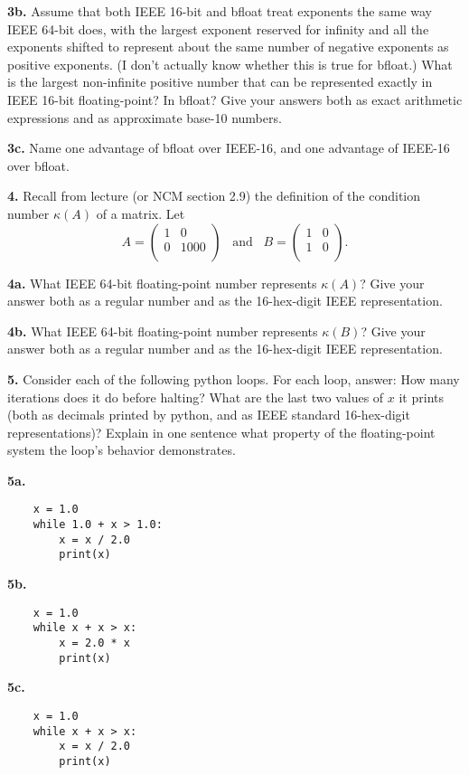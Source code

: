 \documentclass[11pt]{article}
\begin{document}
\par\medskip
{\bf 3b.}
Assume that both IEEE 16-bit and bfloat treat exponents the same way IEEE 64-bit
does, with the largest exponent reserved for infinity and all the exponents
shifted to represent about the same number of negative exponents as positive
exponents. (I don't actually know whether this is true for bfloat.)
What is the largest non-infinite positive number that can be represented exactly
in IEEE 16-bit floating-point? In bfloat? Give your answers both as exact
arithmetic expressions and as approximate base-10 numbers.

\par\medskip
{\bf 3c.}
Name one advantage of bfloat over IEEE-16, 
and one advantage of IEEE-16 over bfloat.

\par\bigskip
{\bf 4.}
Recall from lecture (or NCM section 2.9) the definition of
the condition number $\kappa(A)$ of a matrix. Let
$$
   A =
   \left(
   \begin{array}{cc}
    1 & 0 \\ 	
    0 & 1000 \\ 
   \end{array} \right)
   \hspace{10pt}
   \mbox{and}
   \hspace{10pt}
   B =
   \left(
   \begin{array}{cc}
    1 & 0 \\ 	
    1 & 0 \\ 
   \end{array} \right).
$$

{\bf 4a.}
What IEEE 64-bit floating-point number represents $\kappa(A)$?
Give your answer both as a regular number and as the 
16-hex-digit IEEE representation.

\par\medskip
{\bf 4b.}
What IEEE 64-bit floating-point number represents $\kappa(B)$?
Give your answer both as a regular number and as the 
16-hex-digit IEEE representation.

\par\bigskip
{\bf 5.}
Consider each of the following python loops.
For each loop, answer:
How many iterations does it do before halting?
What are the last two values of $x$ it prints
(both as decimals printed by python, and as
IEEE standard 16-hex-digit representations)?
Explain in one sentence what
property of the floating-point system 
the loop's behavior demonstrates.

\par\medskip
{\bf 5a.}
\begin{verbatim}
    x = 1.0
    while 1.0 + x > 1.0:
        x = x / 2.0
        print(x)
\end{verbatim}

\par\medskip
{\bf 5b.}
\begin{verbatim}
    x = 1.0
    while x + x > x:
        x = 2.0 * x
        print(x)
\end{verbatim}

\par\medskip
{\bf 5c.}
\begin{verbatim}
    x = 1.0
    while x + x > x:
        x = x / 2.0
        print(x)
\end{verbatim}
        
\end{document}
